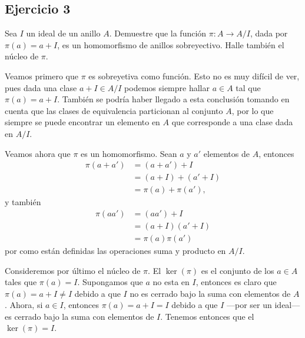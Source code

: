 \subsection*{Ejercicio 3}
	Sea $I$ un ideal de un anillo $A$. Demuestre que la función $\pi\colon A\to A/I$, dada por $\pi(a) = a+I$, es un homomorfismo de anillos sobreyectivo. Halle también el núcleo de $\pi$.
\begin{sol}
	Veamos primero que $\pi$ es sobreyetiva como función. Esto no es muy difícil de ver, pues dada una clase $a+I \in A/I$ podemos siempre hallar $a\in A$ tal que $\pi(a) = a+I$. También se podría haber llegado a esta conclusión tomando en cuenta que las clases de equivalencia particionan al conjunto $A$, por lo que siempre se puede encontrar un elemento en $A$ que corresponde a una clase dada en $A/I$.
	
	Veamos ahora que $\pi$ es un homomorfismo. Sean $a$ y $a'$ elementos de $A$, entonces
	\begin{align*}
		\pi(a+a') &= (a+a') + I \\
				  &= (a+I) + (a'+ I) \\
				  &= \pi(a) + \pi(a'),
	\end{align*}
	y también
	\begin{align*}
		\pi(aa') &= (aa') + I \\
				 &= (a+I)(a'+I) \\
				 &= \pi(a)\pi(a')
	\end{align*}
	por como están definidas las operaciones suma y producto en $A/I$.
	
	Consideremos por último el núcleo de $\pi$. El $\ker (\pi)$ es el conjunto de los $a\in A$ tales que $\pi(a) = I$. Supongamos que $a$ no esta en $I$, entonces es claro que $\pi(a) = a+I \neq I$ debido a que $I$ no es cerrado bajo la suma con elementos de $A$. Ahora, si $a\in I$, entonces $\pi(a) = a + I = I$ debido a que $I$ ---por ser un ideal--- es cerrado bajo la suma con elementos de $I$. Tenemos entonces que el $\ker(\pi) = I$.
\end{sol}
